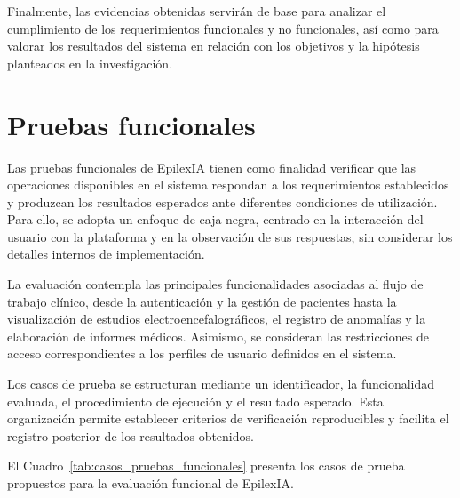 Finalmente, las evidencias obtenidas servirán de base para analizar el cumplimiento de los requerimientos funcionales y no funcionales, así como para valorar los resultados del sistema en relación con los objetivos y la hipótesis planteados en la investigación.


\section{Pruebas funcionales}
\label{sec:pruebas_funcionales}

Las pruebas funcionales de EpilexIA tienen como finalidad verificar que las operaciones disponibles en el sistema respondan a los requerimientos establecidos y produzcan los resultados esperados ante diferentes condiciones de utilización. Para ello, se adopta un enfoque de caja negra, centrado en la interacción del usuario con la plataforma y en la observación de sus respuestas, sin considerar los detalles internos de implementación.

La evaluación contempla las principales funcionalidades asociadas al flujo de trabajo clínico, desde la autenticación y la gestión de pacientes hasta la visualización de estudios electroencefalográficos, el registro de anomalías y la elaboración de informes médicos. Asimismo, se consideran las restricciones de acceso correspondientes a los perfiles de usuario definidos en el sistema.

Los casos de prueba se estructuran mediante un identificador, la funcionalidad evaluada, el procedimiento de ejecución y el resultado esperado. Esta organización permite establecer criterios de verificación reproducibles y facilita el registro posterior de los resultados obtenidos.

El Cuadro~\ref{tab:casos_pruebas_funcionales} presenta los casos de prueba propuestos para la evaluación funcional de EpilexIA.


\begingroup
\small
\setlength{\tabcolsep}{4pt}
\renewcommand{\arraystretch}{1.2}


